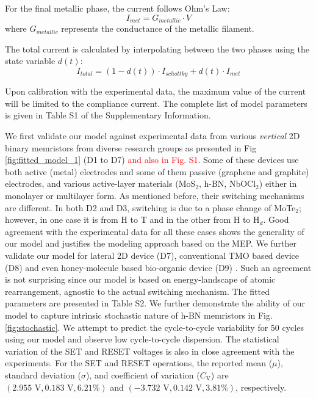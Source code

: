 \documentclass[aip,apl,reprint,floatfix]{revtex4-2}
\begin{document}
For the final metallic phase, the current follows Ohm's Law:
\begin{equation}
    I_{met} = G_{metallic} \cdot V
\end{equation}
where $G_{metallic}$ represents the conductance of the metallic filament.

The total current is calculated by interpolating between the two phases using the state variable $d(t)$:
\begin{equation}
    I_{total} = (1 - d(t)) \cdot I_{schottky} + d(t) \cdot I_{met}
\end{equation}

Upon calibration with the experimental data, the maximum value of the current will be limited to the compliance current. The complete list of model parameters is given in Table S1 of the Supplementary Information.





We first validate our model against experimental data from various \textit{vertical} 2D binary memristors from diverse research groups \cite{hou2024strain,atomrister,zhang2019electric,Sanchali,deng2022,jnohBN} as presented in Fig \ref{fig:fitted_model_1} (D1 to D7) \textcolor{red}{and also in Fig. S1}. Some of these devices use both active (metal) electrodes and some of them passive (graphene and graphite) electrodes, and various active-layer materials (MoS$_{2}$, h-BN, NbOCl$_{2}$) either in monolayer or multilayer form.  As mentioned before, their switching mechanisms are different.  In both D2 and D3, switching is due to a phase change of MoTe$_{2}$; however, in one case it is from H to T and in the other from H to H$_{d}$. Good agreement with the experimental data for all these cases shows the generality of our model and justifies the modeling approach based on the MEP. We further validate our model for lateral 2D device (D7), conventional TMO based device (D8) and even honey-molecule based bio-organic device (D9)  \cite{WSe2,Jiang2016,SUEOKA2022106622}. Such an agreement is not surprising since our model is based on energy-landscape of atomic rearrangement, agnostic to the actual switching mechanism. The fitted parameters are presented in Table S2. We further demonstrate the ability of our model to capture intrinsic stochastic nature of h-BN memristors \cite{Lee} in Fig.\ref{fig:stochastic}. We attempt to predict the cycle-to-cycle variability \cite{deng2022} for 50 cycles using our model and observe low cycle-to-cycle dispersion. The statistical variation of the SET and RESET voltages is also in close agreement with the experiments. For the SET and RESET operations, the reported mean ($\mu$), standard deviation ($\sigma$), and coefficient of variation ($C_{\text{V}}$) are $(2.955\text{ V}, 0.183\text{ V}, 6.21\%)$ and $(-3.732\text{ V}, 0.142\text{ V}, 3.81\%)$, respectively. 
\end{document}
